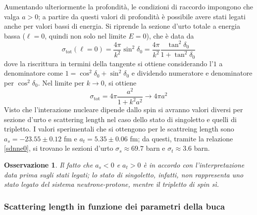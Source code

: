 \documentclass[11pt, a4paper]{scrartcl}
\theoremstyle{style}
\newtheorem{osservazione}{Osservazione}[section]
\numberwithin{equation}{subsection}
\begin{document}
		Aumentando ulteriormente la profondit\`a, le condizioni di raccordo impongono che valga $a > 0$; a partire da questi valori di profondit\`a \`e possibile avere stati legati anche per valori bassi di energia.
Si riprende la sezione d'urto totale a energia bassa ($\ell =0$, quindi non solo nel limite $E=0$), che \`e data da 
\[
	\sigma _\text{tot} ( \ell =0)  = \frac{4\pi}{k^2} \sin^2 \delta _0 = \frac{4\pi}{k^2} \frac{\tan^2 \delta _0}{1 + \tan^2 \delta _0}
\] 
dove la riscrittura in termini della tangente si ottiene considerando l'$1$ a denominatore come $1 = \cos^2 \delta _0 + \sin^2 \delta _0$ e dividendo numeratore e denominatore per $\cos^2 \delta _0$.
Nel limite per $k\to 0$, si ottiene
\begin{equation}\label{sdnne0}
 \sigma  _\text{tot} =  4\pi \frac{a^2}{1 + k^2 a^2} \to  4 \pi a^2
\end{equation}
Visto che l'interazione nucleare dipende dallo spin si avranno valori diversi per sezione d'urto e scattering length nel caso dello stato di singoletto e quelli di tripletto.
I valori sperimentali che si ottengono per le scattreing length sono $a_s = -23.55\pm 0.12$ fm e $a_t = 5.35 \pm 0.06$ fm; da questi, tramite la relazione \ref{sdnne0}, si trovano le sezioni d'urto $\sigma _s \approx 69 . 7$ barn e $\sigma _t \approx 3.6$ barn.
\begin{osservazione}
Il fatto che $a_s < 0$ e $a_t > 0$ \`e in accordo con l'interpretazione data prima sugli stati legati; lo stato di singoletto, infatti, non rappresenta uno stato legato del sistema neutrone-protone, mentre il tripletto di spin s\`i.
\end{osservazione}

\subsubsection{Scattering length in funzione dei parametri della buca}
\end{document}
